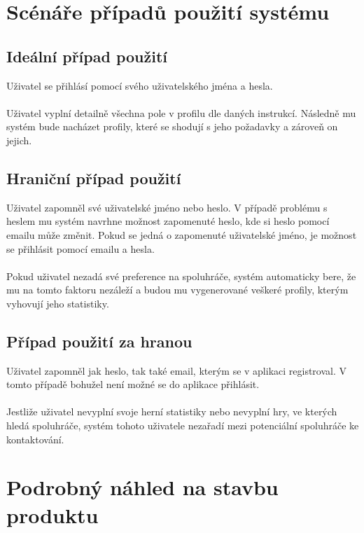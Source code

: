 \documentclass[czech,12pt,a4paper,titlepage]{article}
\begin{document}
\clearpage

\section{Scénáře případů použití systému}

\subsection{Ideální případ použití}

Uživatel se přihlásí pomocí svého uživatelského jména a hesla.\\ \\
Uživatel vyplní detailně všechna pole v profilu dle daných instrukcí.
Následně mu systém bude nacházet profily, které se shodují s jeho požadavky a zároveň on jejich.

\subsection{Hraniční případ použití}

Uživatel zapomněl své uživatelské jméno nebo heslo. V případě problému s heslem mu systém
navrhne možnost zapomenuté heslo, kde si heslo pomocí emailu může změnit. Pokud se jedná o
zapomenuté uživatelské jméno, je možnost se přihlásit pomocí emailu a hesla. \\ \\
Pokud uživatel nezadá své preference na spoluhráče, systém automaticky bere, že mu na tomto
faktoru nezáleží a budou mu vygenerované veškeré profily, kterým vyhovují jeho statistiky.

\subsection{Případ použití za hranou}

Uživatel zapomněl jak heslo, tak také email, kterým se v aplikaci registroval. V tomto
případě bohužel není možné se do aplikace přihlásit. \\ \\
Jestliže uživatel nevyplní svoje herní statistiky nebo nevyplní hry, ve kterých hledá
spoluhráče, systém tohoto uživatele nezařadí mezi potenciální spoluhráče ke kontaktování.

\clearpage

\section{Podrobný náhled na stavbu produktu}
\end{document}
